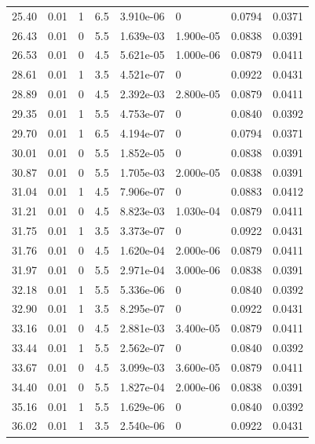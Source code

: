 \documentclass[preview]{standalone}
\begin{document}
{{{\begin{tabular}{L{1.2cm}C{1.2cm} C{0.3cm}C{0.5cm} C{1.4cm}C{1.4cm} C{1.4cm}C{1.4cm}}
  25.40  &  0.01  & 1     & 6.5 &  3.910e-06  & 0  & 0.0794 &  0.0371   \\ 
  26.43  &  0.01  & 0     & 5.5 &  1.639e-03  & 1.900e-05  & 0.0838 &  0.0391   \\ 
  26.53  &  0.01  & 0     & 4.5 &  5.621e-05  & 1.000e-06  & 0.0879 &  0.0411   \\ 
  28.61  &  0.01  & 1     & 3.5 &  4.521e-07  & 0  & 0.0922 &  0.0431   \\ 
  28.89  &  0.01  & 0     & 4.5 &  2.392e-03  & 2.800e-05  & 0.0879 &  0.0411   \\ 
  29.35  &  0.01  & 1     & 5.5 &  4.753e-07  & 0  & 0.0840 &  0.0392   \\ 
  29.70  &  0.01  & 1     & 6.5 &  4.194e-07  & 0  & 0.0794 &  0.0371   \\ 
  30.01  &  0.01  & 0     & 5.5 &  1.852e-05  & 0  & 0.0838 &  0.0391   \\ 
  30.87  &  0.01  & 0     & 5.5 &  1.705e-03  & 2.000e-05  & 0.0838 &  0.0391   \\ 
  31.04  &  0.01  & 1     & 4.5 &  7.906e-07  & 0  & 0.0883 &  0.0412   \\ 
  31.21  &  0.01  & 0     & 4.5 &  8.823e-03  & 1.030e-04  & 0.0879 &  0.0411   \\ 
  31.75  &  0.01  & 1     & 3.5 &  3.373e-07  & 0  & 0.0922 &  0.0431   \\ 
  31.76  &  0.01  & 0     & 4.5 &  1.620e-04  & 2.000e-06  & 0.0879 &  0.0411   \\ 
  31.97  &  0.01  & 0     & 5.5 &  2.971e-04  & 3.000e-06  & 0.0838 &  0.0391   \\ 
  32.18  &  0.01  & 1     & 5.5 &  5.336e-06  & 0  & 0.0840 &  0.0392   \\ 
  32.90  &  0.01  & 1     & 3.5 &  8.295e-07  & 0  & 0.0922 &  0.0431   \\ 
  33.16  &  0.01  & 0     & 4.5 &  2.881e-03  & 3.400e-05  & 0.0879 &  0.0411   \\ 
  33.44  &  0.01  & 1     & 5.5 &  2.562e-07  & 0  & 0.0840 &  0.0392   \\ 
  33.67  &  0.01  & 0     & 4.5 &  3.099e-03  & 3.600e-05  & 0.0879 &  0.0411   \\ 
  34.40  &  0.01  & 0     & 5.5 &  1.827e-04  & 2.000e-06  & 0.0838 &  0.0391   \\ 
  35.16  &  0.01  & 1     & 5.5 &  1.629e-06  & 0  & 0.0840 &  0.0392   \\ 
  36.02  &  0.01  & 1     & 3.5 &  2.540e-06  & 0  & 0.0922 &  0.0431   \\ 

\end{tabular}}}}
\end{document}
